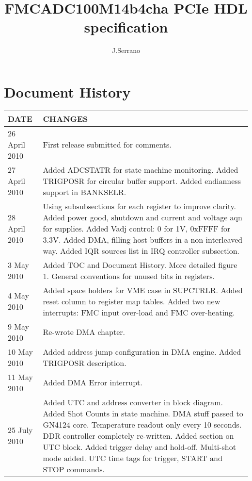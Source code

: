 \documentclass{article}
\title{FMCADC100M14b4cha PCIe HDL specification}
\author{J.Serrano}
\begin{document}
\maketitle
\pagebreak

\section*{Document History}
\begin{table}[htbp]
  \centering
  \begin{tabularx}{\textwidth}{|l|X|}
    \hline
    \textbf{DATE} & \textbf{CHANGES} \\
    \hline
    \hline
    26 April 2010 & First release submitted for comments.\\
    \hline
    27 April 2010 & Added ADCSTATR for state machine monitoring. Added TRIGPOSR for circular buffer support. Added endianness support in BANKSELR.\\
    \hline
    28 April 2010 & Using subsubsections for each register to improve clarity. Added power good, shutdown and current and voltage aqn for supplies. Added Vadj control: 0 for 1V, 0xFFFF for 3.3V. Added DMA, filling host buffers in a non-interleaved way. Added IQR sources list in IRQ controller subsection.\\
    \hline
    3 May 2010 & Added TOC and Document History. More detailed figure 1. General conventions for unused bits in registers. \\ 
    \hline
    4 May 2010 & Added space holders for VME case in SUPCTRLR. Added reset column to register map tables. Added two new interrupts: FMC input over-load and FMC over-heating.\\
    \hline
    9 May 2010 & Re-wrote DMA chapter.\\
    \hline
    10 May 2010 & Added address jump configuration in DMA engine. Added TRIGPOSR description.\\
    \hline
    11 May 2010 & Added DMA Error interrupt.\\
    \hline
    25 July 2010 & Added UTC and address converter in block diagram. Added Shot Counts in state machine. DMA stuff passed to GN4124 core. Temperature readout only every 10 seconds. DDR controller completely re-written. Added section on UTC block. Added trigger delay and hold-off. Multi-shot mode added. UTC time tags for trigger, START and STOP commands.\\
    \hline
  \end{tabularx}
\end{table}
\end{document}
